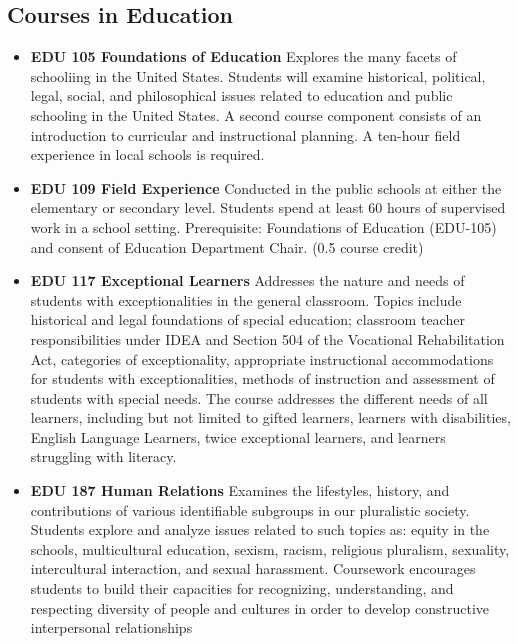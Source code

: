 \documentclass[
  letterpaper,
]{scrbook}
\providecommand{\tightlist}{%
  \setlength{\itemsep}{0pt}\setlength{\parskip}{0pt}}
\begin{document}
\subsection{Courses in Education}\label{courses-in-education}

\begin{itemize}
\tightlist
\item
  \textbf{EDU 105 Foundations of Education} Explores the many facets of
  schooliing in the United States. Students will examine historical,
  political, legal, social, and philosophical issues related to
  education and public schooling in the United States. A second course
  component consists of an introduction to curricular and instructional
  planning. A ten-hour field experience in local schools is required.\\
\item
  \textbf{EDU 109 Field Experience} Conducted in the public schools at
  either the elementary or secondary level. Students spend at least 60
  hours of supervised work in a school setting. Prerequisite:
  Foundations of Education (EDU-105) and consent of Education Department
  Chair. (0.5 course credit)\\
\item
  \textbf{EDU 117 Exceptional Learners} Addresses the nature and needs
  of students with exceptionalities in the general classroom. Topics
  include historical and legal foundations of special education;
  classroom teacher responsibilities under IDEA and Section 504 of the
  Vocational Rehabilitation Act, categories of exceptionality,
  appropriate instructional accommodations for students with
  exceptionalities, methods of instruction and assessment of students
  with special needs. The course addresses the different needs of all
  learners, including but not limited to gifted learners, learners with
  disabilities, English Language Learners, twice exceptional learners,
  and learners struggling with literacy.\\
\item
  \textbf{EDU 187 Human Relations} Examines the lifestyles, history, and
  contributions of various identifiable subgroups in our pluralistic
  society. Students explore and analyze issues related to such topics
  as: equity in the schools, multicultural education, sexism, racism,
  religious pluralism, sexuality, intercultural interaction, and sexual
  harassment. Coursework encourages students to build their capacities
  for recognizing, understanding, and respecting diversity of people and
  cultures in order to develop constructive interpersonal relationships

\end{itemize}
\end{document}
